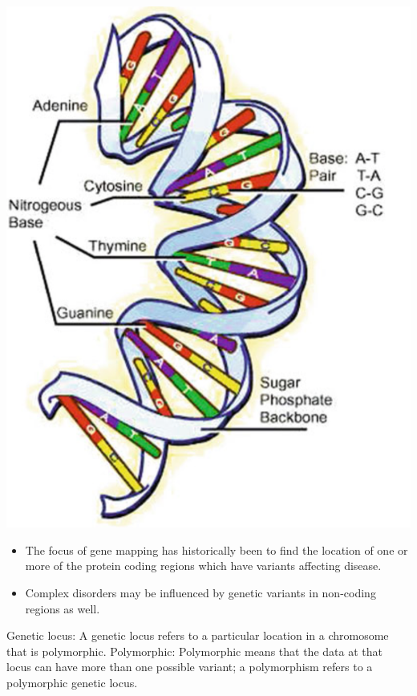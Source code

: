 \documentclass[a4paper,twoside,11pt]{article}
\begin{document}
\begin{center}
\includegraphics[scale=0.5]{figure1.png}
\end{center}
\begin{itemize}
    \item The focus of gene mapping has historically been to find the location of one or more of the protein coding regions which have variants affecting disease.
    \item Complex disorders may be influenced by genetic variants in non-coding regions as well.
\end{itemize}
\textcolor{NavyBlue}{Genetic locus: }A genetic locus refers to a particular location in a chromosome that is polymorphic.
\newline
\newline
\textcolor{NavyBlue}{Polymorphic: }Polymorphic means that the data at that locus can have more than one possible variant; a polymorphism refers to a polymorphic genetic locus.
\newline
\newline
\end{document}
